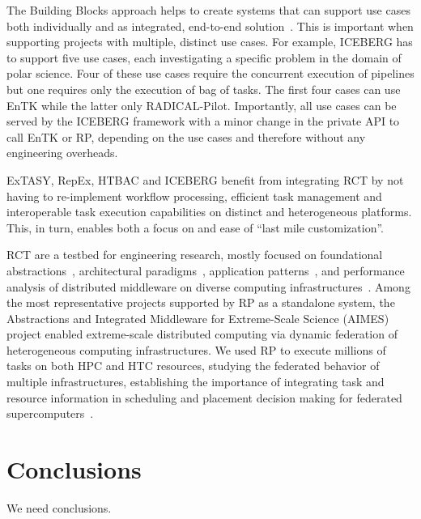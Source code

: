 \documentclass[preprint,12pt, a4paper]{elsarticle}
\begin{document}
The Building Blocks approach helps to create systems that can support use
cases both individually and as integrated, end-to-end
solution~\cite{turilli2019middleware}. This is important when supporting
projects with multiple, distinct use cases. For example, ICEBERG has to
support five use cases, each investigating a specific problem in the domain
of polar science. Four of these use cases require the concurrent execution of
pipelines but one requires only the execution of bag of tasks. The first four
cases can use EnTK while the latter only RADICAL-Pilot. Importantly, all use
cases can be served by the ICEBERG framework with a minor change in the
private API to call EnTK or RP, depending on the use cases and therefore
without any engineering overheads.

ExTASY, RepEx, HTBAC and ICEBERG benefit from integrating RCT by not having
to re-implement workflow processing, efficient task management and
interoperable task execution capabilities on distinct and heterogeneous
platforms. This, in turn, enables both a focus on and ease of ``last mile
customization''.

RCT are a testbed for engineering research, mostly focused on foundational
abstractions~\cite{turilli2017evaluating}, architectural
paradigms~\cite{turilli2018comprehensive}, application
patterns~\cite{balasubramanian2016extasy,balasubramanian2018harnessing}, and
performance analysis of distributed middleware on diverse computing
infrastructures~\cite{turilli2017evaluating,dakka2018high}. Among the most
representative projects supported by RP as a standalone system, the
Abstractions and Integrated Middleware for Extreme-Scale Science (AIMES)
project enabled extreme-scale distributed computing via dynamic federation of
heterogeneous computing infrastructures. We used RP to execute millions of
tasks on both HPC and HTC resources, studying the federated behavior of
multiple infrastructures, establishing the importance of integrating task and
resource information in scheduling and placement decision making for
federated supercomputers~\cite{turilli2016integrating}.


\section{Conclusions}\label{sec:conclusions}

We need conclusions.
\end{document}

